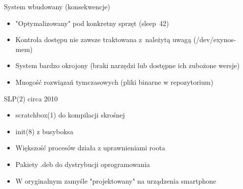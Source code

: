 \documentclass[presentation,aspectratio=43,12pt]{beamer}
\begin{document}
\begin{frame}[label=sec-4-3]{System wbudowany (konsekwencje)}
\begin{itemize}
\item "Optymalizowany" pod konkretny sprzęt (sleep~42)

\item <2-> Kontrola dostępu nie zawsze traktowana z~należytą uwagą
(/dev/exynos-mem)

\item <3-> System bardzo okrojony (braki narzędzi lub dostępne ich
zubożone wersje)

\item <4-> Mnogość rozwiązań tymczasowych (pliki binarne w
repozytorium)
\end{itemize}


\end{frame}


\begin{frame}[label=sec-4-4]{SLP(2) circa 2010}
\begin{itemize}
\item scratchbox(1) do kompilacji skrośnej
\item init(8) z busyboksa
\item Większość procesów działa z uprawnieniami roota
\item Pakiety .deb do dystrybucji oprogramowania
\end{itemize}


\begin{itemize}
\item W oryginalnym zamyśle "projektowany" na urządzenia smartphone
\end{itemize}

\end{frame}
\end{document}
